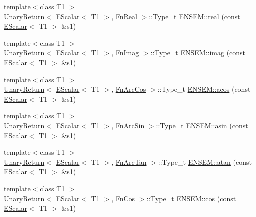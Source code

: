 \begin{DoxyCompactItemize}
\item 
{\footnotesize template$<$class T1 $>$ }\\\mbox{\hyperlink{structENSEM_1_1UnaryReturn}{Unary\+Return}}$<$ \mbox{\hyperlink{classENSEM_1_1EScalar}{E\+Scalar}}$<$ T1 $>$, \mbox{\hyperlink{structENSEM_1_1FnReal}{Fn\+Real}} $>$\+::Type\+\_\+t \mbox{\hyperlink{group__escalar_gae1f319d978abc1631bd68382787544aa}{E\+N\+S\+E\+M\+::real}} (const \mbox{\hyperlink{classENSEM_1_1EScalar}{E\+Scalar}}$<$ T1 $>$ \&s1)
\item 
{\footnotesize template$<$class T1 $>$ }\\\mbox{\hyperlink{structENSEM_1_1UnaryReturn}{Unary\+Return}}$<$ \mbox{\hyperlink{classENSEM_1_1EScalar}{E\+Scalar}}$<$ T1 $>$, \mbox{\hyperlink{structENSEM_1_1FnImag}{Fn\+Imag}} $>$\+::Type\+\_\+t \mbox{\hyperlink{group__escalar_ga415448f22c6dabfd82cbb0154e054c2e}{E\+N\+S\+E\+M\+::imag}} (const \mbox{\hyperlink{classENSEM_1_1EScalar}{E\+Scalar}}$<$ T1 $>$ \&s1)
\item 
{\footnotesize template$<$class T1 $>$ }\\\mbox{\hyperlink{structENSEM_1_1UnaryReturn}{Unary\+Return}}$<$ \mbox{\hyperlink{classENSEM_1_1EScalar}{E\+Scalar}}$<$ T1 $>$, \mbox{\hyperlink{structENSEM_1_1FnArcCos}{Fn\+Arc\+Cos}} $>$\+::Type\+\_\+t \mbox{\hyperlink{group__escalar_gac8e90d16773622bd9971db55f0c125c9}{E\+N\+S\+E\+M\+::acos}} (const \mbox{\hyperlink{classENSEM_1_1EScalar}{E\+Scalar}}$<$ T1 $>$ \&s1)
\item 
{\footnotesize template$<$class T1 $>$ }\\\mbox{\hyperlink{structENSEM_1_1UnaryReturn}{Unary\+Return}}$<$ \mbox{\hyperlink{classENSEM_1_1EScalar}{E\+Scalar}}$<$ T1 $>$, \mbox{\hyperlink{structENSEM_1_1FnArcSin}{Fn\+Arc\+Sin}} $>$\+::Type\+\_\+t \mbox{\hyperlink{group__escalar_gab463bdb3f1fadf6b5a87076e5d3dc9b9}{E\+N\+S\+E\+M\+::asin}} (const \mbox{\hyperlink{classENSEM_1_1EScalar}{E\+Scalar}}$<$ T1 $>$ \&s1)
\item 
{\footnotesize template$<$class T1 $>$ }\\\mbox{\hyperlink{structENSEM_1_1UnaryReturn}{Unary\+Return}}$<$ \mbox{\hyperlink{classENSEM_1_1EScalar}{E\+Scalar}}$<$ T1 $>$, \mbox{\hyperlink{structENSEM_1_1FnArcTan}{Fn\+Arc\+Tan}} $>$\+::Type\+\_\+t \mbox{\hyperlink{group__escalar_ga3169598490417ab5713660967ec6b658}{E\+N\+S\+E\+M\+::atan}} (const \mbox{\hyperlink{classENSEM_1_1EScalar}{E\+Scalar}}$<$ T1 $>$ \&s1)
\item 
{\footnotesize template$<$class T1 $>$ }\\\mbox{\hyperlink{structENSEM_1_1UnaryReturn}{Unary\+Return}}$<$ \mbox{\hyperlink{classENSEM_1_1EScalar}{E\+Scalar}}$<$ T1 $>$, \mbox{\hyperlink{structENSEM_1_1FnCos}{Fn\+Cos}} $>$\+::Type\+\_\+t \mbox{\hyperlink{group__escalar_ga841db2f3f6d6a553733b1b75a638f052}{E\+N\+S\+E\+M\+::cos}} (const \mbox{\hyperlink{classENSEM_1_1EScalar}{E\+Scalar}}$<$ T1 $>$ \&s1)

\end{DoxyCompactItemize}
